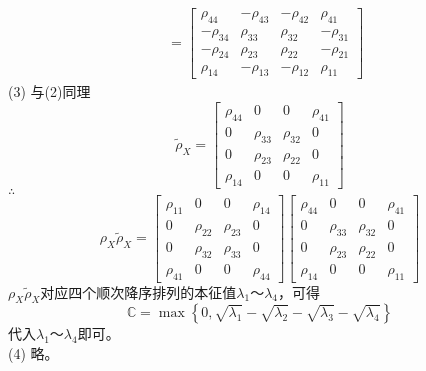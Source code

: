 \documentclass[12pt]{article}
\numberwithin{equation}{section}	 %
\begin{document}
\begin{spacing}{1.5}
\begin{align*}
&= \begin{bmatrix} \rho_{44} & -\rho_{43} & -\rho_{42} & \rho_{41} \\ -\rho_{34} & \rho_{33} & \rho_{32} & -\rho_{31} \\ -\rho_{24} & \rho_{23} & \rho_{22} & -\rho_{21} \\ \rho_{14} & -\rho_{13} & -\rho_{12} & \rho_{11} \end{bmatrix}
\end{align*}
(3) 与(2)同理
\begin{equation}
\tilde{\rho}_{X} = \begin{bmatrix} \rho_{44} & 0 & 0 & \rho_{41} \\ 0 & \rho_{33} & \rho_{32} & 0 \\ 0 & \rho_{23} & \rho_{22} & 0 \\ \rho_{14} & 0 & 0 & \rho_{11} \end{bmatrix}
\end{equation}
$\therefore$
\begin{equation}
{\rho}_{X}\tilde{\rho}_{X} = \begin{bmatrix} \rho_{11} & 0 & 0 & \rho_{14} \\ 0 & \rho_{22} & \rho_{23} & 0 \\ 0 & \rho_{32} & \rho_{33} & 0 \\ \rho_{41} & 0 & 0 & \rho_{44} \end{bmatrix}  \begin{bmatrix} \rho_{44} & 0 & 0 & \rho_{41} \\ 0 & \rho_{33} & \rho_{32} & 0 \\ 0 & \rho_{23} & \rho_{22} & 0 \\ \rho_{14} & 0 & 0 & \rho_{11} \end{bmatrix}
\end{equation}
${\rho}_{X}\tilde{\rho}_{X}$对应四个顺次降序排列的本征值$\lambda_{1}$～$\lambda_{4}$，可得\\
\begin{equation}
\mathbb{C} = \max\left\{0,\sqrt{\lambda_{1}}-\sqrt{\lambda_{2}}-\sqrt{\lambda_{3}}-\sqrt{\lambda_{4}}\right\}
\end{equation}
代入$\lambda_{1}$～$\lambda_{4}$即可。\\
(4) 略。
\newpage

\end{spacing}
\end{document}
